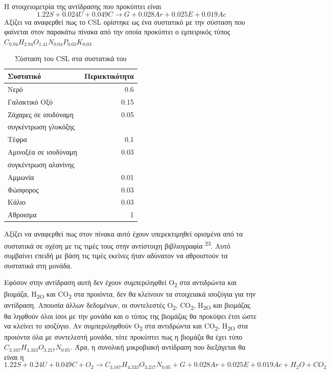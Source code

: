 \documentclass[11pt]{article}
\makeatletter
\newcommand{\citeprocitem}[2]{\hyper@linkstart{cite}{citeproc_bib_item_#1}#2\hyper@linkend}
\makeatother
\begin{document}
Η στοιχειομετρία της αντίδρασης που προκύπτει είναι
\[ 1.22S + 0.024U + 0.049C \rightarrow G + 0.028Ar + 0.025E + 0.019Ac \]
Αξίζει να αναφερθεί πως το CSL ορίστηκε ως ένα συστατικό με την σύσταση που φαίνεται στον παρακάτω πίνακα από την οποία προκύπτει ο εμπειρικός τύπος
\(C_{0.94}H_{2.94}O_{1.41}N_{0.04}P_{0.03}K_{0.03}\)
\begin{table}[htbp]
\caption{Σύσταση του CSL στα συστατικά του}
\centering
\begin{tabular}{lr}
Συστατικό & Περιεκτικότητα\\
\hline
Νερό & 0.6\\
Γαλακτικό Οξύ & 0.15\\
Ζάχαρες σε ισοδύναμη & 0.05\\
συγκέντρωση γλυκόζης & \\
Τέφρα & 0.1\\
Αμινοξέα σε ισοδύναμη & 0.03\\
συγκέντρωση αλανίνης & \\
Αμμωνία & 0.01\\
Φώσφορος & 0.03\\
Κάλιο & 0.03\\
\hline
Άθροισμα & 1\\
\end{tabular}
\end{table}

Αξίζει να αναφερθεί πως στον πίνακα αυτό έχουν υπερεκτιμηθεί ορισμένα από τα συστατικά σε σχέση με τις τιμές τους στην αντίστοιχη βιβλιογραφία \textsuperscript{\citeprocitem{23}{23}}. Αυτό συμβαίνει επειδή με βάση τις τιμές εκείνες ήταν αδύνατον να αθροιστούν τα συστατικά στη μονάδα.

Εφόσον στην αντίδραση αυτή δεν έχουν συμπεριληφθεί O\textsubscript{2} στα αντιδρώντα και βιομάζα, H\textsubscript{2O} και CO\textsubscript{2} στα προιόντα, δεν θα κλείνουν τα στοιχειακά ισοζύγια για την αντίδραση. Απουσία άλλων δεδομένων, οι συντελεστές Ο\textsubscript{2}, CO\textsubscript{2}, H\textsubscript{2O} και βιομάζας θα ληφθούν όλοι ίσοι με την μονάδα και ο τύπος της βιομάζας θα προκύψει έτσι ώστε να κλείνει το ισοζύγιο. Αν συμπεριληφθούν O\textsubscript{2} στα αντιδρώντα και CO\textsubscript{2}, H\textsubscript{2O} στα προιόντα όλα με συντελεστή μονάδα, τότε προκύπτει πως η βιομάζα θα έχει τύπο \(C_{3.167}H_{4.333}O_{3.217}N_{0.05}\). Άρα, η συνολική μικροβιακή αντίδραση που διεξάγεται θα είναι η
\[ 1.22S + 0.24U + 0.049C + O_2 \rightarrow C_{3.167}H_{4.333}O_{3.217}N_{0.05} + G + 0.028Ar +0.025E + 0.019Ac + H_2O +CO_2 \]
\end{document}
